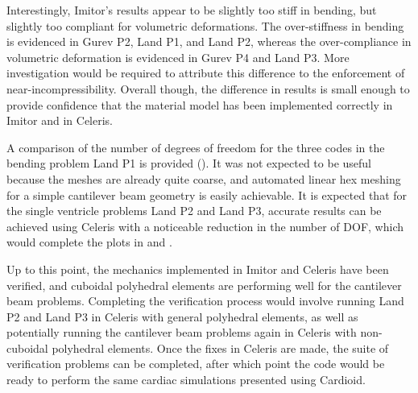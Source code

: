 Interestingly, Imitor's results appear to be slightly too stiff in bending, but slightly too compliant for volumetric deformations. The over-stiffness in bending is evidenced in Gurev P2, Land P1, and Land P2, whereas the over-compliance in volumetric deformation is evidenced in Gurev P4 and Land P3. More investigation would be required to attribute this difference to the enforcement of near-incompressibility. Overall though, the difference in results is small enough to provide confidence that the material model has been implemented correctly in Imitor and in Celeris.

A comparison of the number of degrees of freedom for the three codes in the bending problem Land P1 is provided (). It was not expected to be useful because the meshes are already quite coarse, and automated linear hex meshing for a simple cantilever beam geometry is easily achievable. It is expected that for the single ventricle problems Land P2 and Land P3, accurate results can be achieved using Celeris with a noticeable reduction in the number of DOF, which would complete the plots in  and .

Up to this point, the mechanics implemented in Imitor and Celeris have been verified, and cuboidal polyhedral elements are performing well for the cantilever beam problems. Completing the verification process would involve running Land P2 and Land P3 in Celeris with general polyhedral elements, as well as potentially running the cantilever beam problems again in Celeris with non-cuboidal polyhedral elements. Once the fixes in Celeris are made, the suite of verification problems can be completed, after which point the code would be ready to perform the same cardiac simulations presented using Cardioid.

